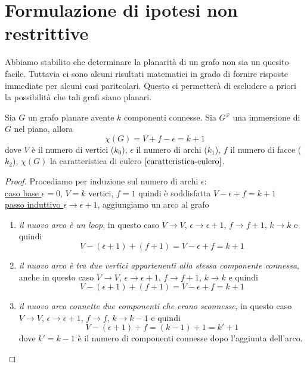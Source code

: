 \section{Formulazione di ipotesi non restrittive}
Abbiamo stabilito che determinare la planarità di un grafo non sia un quesito facile. Tuttavia ci sono alcuni risultati matematici in grado di fornire risposte immediate per alcuni casi paritcolari. Questo ci permetterà di escludere a priori la possibilità che tali grafi siano planari.
\begin{teorema}\label{eulero-generica}
    Sia \(G\) un grafo planare avente \(k\) componenti connesse. Sia \(G^\varphi\) una immersione di \(G\) nel piano, allora
    \begin{equation}
        \chi(G)=V+f-\epsilon = k+1
    \end{equation}
    dove \(V\) è il numero di vertici (\(k_0\)), \(\epsilon\) il numero di archi (\(k_1\)), \(f\) il numero di facce (\(k_2\)), \(\chi(G)\) la caratteristica di eulero \(\ref{caratteristica-eulero}\).
    \begin{proof}
        Procediamo per induzione sul numero di archi \( \epsilon \): \smallskip \\
        \underline{caso base \(\epsilon=0\)}, \(V=k\) vertici, \(f=1\) quindi è soddisfatta \(V-\epsilon+f = k+1\)\smallskip \\
        \underline{passo induttivo \(\epsilon \to \epsilon + 1\)}, aggiungiamo un arco al grafo
        \begin{enumerate}
            \item \textit{il nuovo arco è un loop}, in questo caso \(V \to V\), \(\epsilon \to \epsilon +1\), \(f \to f+1\), \(k \to k\) e quindi
                  \begin{equation}
                      V-(\epsilon+1)+(f+1)=V-\epsilon+f=k+1
                  \end{equation}
            \item \textit{il nuovo arco è tra due vertici appartenenti alla stessa componente connessa}, anche in questo caso \(V \to V\), \(\epsilon \to \epsilon +1\), \(f \to f+1\), \(k \to k\) e quindi
                  \begin{equation}
                      V-(\epsilon+1)+(f+1)=V-\epsilon+f=k+1
                  \end{equation}
            \item \textit{il nuovo arco connette due componenti che erano sconnesse}, in questo caso \(V \to V\), \(\epsilon \to \epsilon +1\), \(f \to f\), \(k \to k-1\) e quindi
                  \begin{equation}
                      V-(\epsilon +1)+f = (k-1) + 1 = k'+1
                  \end{equation}
                  dove \(k'=k-1\) è il numero di componenti connesse dopo l'aggiunta dell'arco.
        \end{enumerate}
    \end{proof}
\end{teorema}

